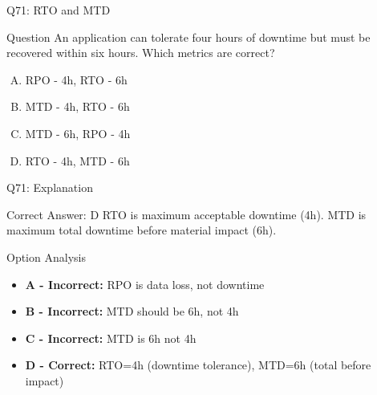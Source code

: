 \documentclass{beamer}
\begin{document}
	\begin{frame}{Q71: RTO and MTD}
		\begin{block}{Question}
			An application can tolerate four hours of downtime but must be recovered within six hours. Which metrics are correct?
		\end{block}
		\begin{enumerate}[(A)]
			\item RPO - 4h, RTO - 6h
			\item MTD - 4h, RTO - 6h
			\item MTD - 6h, RPO - 4h
			\item RTO - 4h, MTD - 6h
		\end{enumerate}
	\end{frame}
	
	\begin{frame}{Q71: Explanation}
		\begin{block}{Correct Answer: D}
			RTO is maximum acceptable downtime (4h). MTD is maximum total downtime before material impact (6h).
		\end{block}
		\begin{block}{Option Analysis}
			\begin{itemize}
				\item \textbf{A - Incorrect:} RPO is data loss, not downtime
				\item \textbf{B - Incorrect:} MTD should be 6h, not 4h
				\item \textbf{C - Incorrect:} MTD is 6h not 4h
				\item \textbf{D - Correct:} RTO=4h (downtime tolerance), MTD=6h (total before impact)
			\end{itemize}
		\end{block}
	\end{frame}
	
\end{document}
